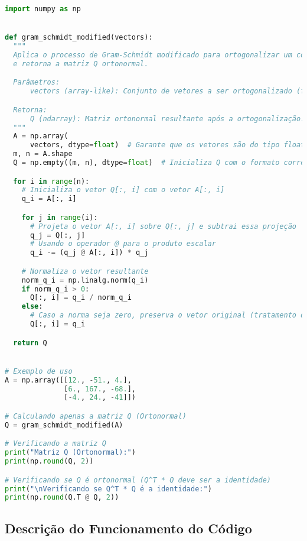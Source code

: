 \vspace{8pt}
\begin{lstlisting}[language=Python, caption={Implementação do algoritmo de Gram-Schmidt modificado para ortogonalização e normalização de vetores.}]
import numpy as np


def gram_schmidt_modified(vectors):
  """
  Aplica o processo de Gram-Schmidt modificado para ortogonalizar um conjunto de vetores
  e retorna a matriz Q ortonormal.

  Parâmetros:
      vectors (array-like): Conjunto de vetores a ser ortogonalizado (forma (m, n)).

  Retorna:
      Q (ndarray): Matriz ortonormal resultante após a ortogonalização.
  """
  A = np.array(
      vectors, dtype=float)  # Garante que os vetores são do tipo float
  m, n = A.shape
  Q = np.empty((m, n), dtype=float)  # Inicializa Q com o formato correto

  for i in range(n):
    # Inicializa o vetor Q[:, i] com o vetor A[:, i]
    q_i = A[:, i]

    for j in range(i):
      # Projeta o vetor A[:, i] sobre Q[:, j] e subtrai essa projeção
      q_j = Q[:, j]
      # Usando o operador @ para o produto escalar
      q_i -= (q_j @ A[:, i]) * q_j

    # Normaliza o vetor resultante
    norm_q_i = np.linalg.norm(q_i)
    if norm_q_i > 0:
      Q[:, i] = q_i / norm_q_i
    else:
      # Caso a norma seja zero, preserva o vetor original (tratamento de erro)
      Q[:, i] = q_i

  return Q


# Exemplo de uso
A = np.array([[12., -51., 4.],
              [6., 167., -68.],
              [-4., 24., -41]])

# Calculando apenas a matriz Q (Ortonormal)
Q = gram_schmidt_modified(A)

# Verificando a matriz Q
print("Matriz Q (Ortonormal):")
print(np.round(Q, 2))

# Verificando se Q é ortonormal (Q^T * Q deve ser a identidade)
print("\nVerificando se Q^T * Q é a identidade:")
print(np.round(Q.T @ Q, 2))
\end{lstlisting}

\subsection{Descrição do Funcionamento do Código}

